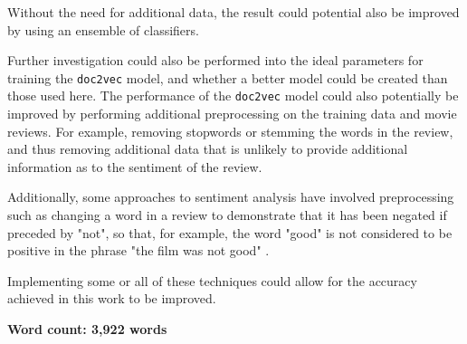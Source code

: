 \documentclass[twocolumn]{article}
\begin{document}
Without the need for additional data, the result could potential also be improved by using an ensemble of classifiers.

Further investigation could also be performed into the ideal parameters for training the \texttt{doc2vec} model, and whether a better model could be created than those used here. The performance of the \texttt{doc2vec} model could also potentially be improved by performing additional preprocessing on the training data and movie reviews. For example, removing stopwords or stemming the words in the review, and thus removing additional data that is unlikely to provide additional information as to the sentiment of the review.

Additionally, some approaches to sentiment analysis have involved preprocessing such as changing a word in a review to demonstrate that it has been negated if preceded by "not", so that, for example, the word "good" is not considered to be positive in the phrase "the film was not good" \cite{pang}.

Implementing some or all of these techniques could allow for the accuracy achieved in this work to be improved.


\textbf{Word count: 3,922 words}

{}

\end{document}
